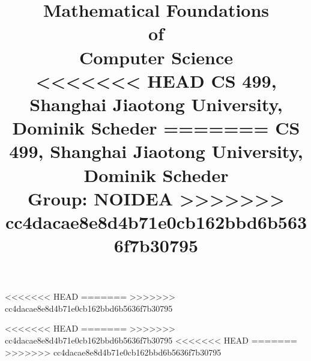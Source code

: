 \newcommand{\N}{\mathbb{N}}
\newcommand{\nn}{\mathbb{N}_0^n}
\newcommand{\R}{\mathbb{R}}
\newcommand{\Z}{\mathbb{Z}}

<<<<<<< HEAD
=======
\newenvironment{solution}
  {\renewcommand\qedsymbol{$\blacksquare$}\begin{proof}[Solution]}
  {\end{proof}}
>>>>>>> cc4dacae8e8d4b71e0cb162bbd6b5636f7b30795



\date{}

\title{
  Mathematical Foundations \\of \\Computer Science\\
  \vspace{3mm}
<<<<<<< HEAD
{\normalsize CS 499,	Shanghai Jiaotong University,  Dominik Scheder}
=======
{\normalsize CS 499,	Shanghai Jiaotong University,  Dominik Scheder}\\
  \vspace{3mm}
{\normalsize Group: NOIDEA}
>>>>>>> cc4dacae8e8d4b71e0cb162bbd6b5636f7b30795
}



\maketitle

%
<<<<<<< HEAD
=======
>>>>>>> cc4dacae8e8d4b71e0cb162bbd6b5636f7b30795
%
<<<<<<< HEAD
=======
>>>>>>> cc4dacae8e8d4b71e0cb162bbd6b5636f7b30795
